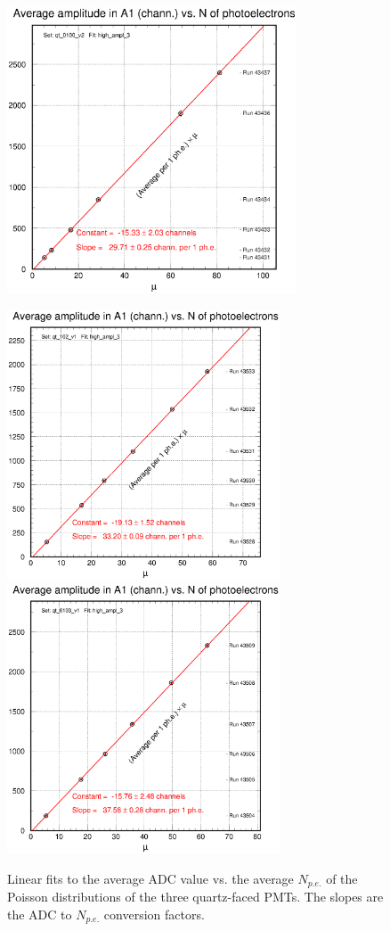 \begin{figure}
\vspace{0.5cm}
\begin{centering}
\includegraphics[height=8.5cm]{PMT-studies/qt_0100_v2_result.eps}
\end{centering}
\begin{centering}
\includegraphics[height=8.0cm]{PMT-studies/qt_0102_v1_result.eps}
\includegraphics[height=8.0cm]{PMT-studies/qt_0103_v1_result.eps}
\vspace{0.5cm}
\caption{\small{Linear fits to the average ADC value vs. the average 
$N_{p.e.}$ of the Poisson distributions of the three quartz-faced PMTs.  
The slopes are the ADC to $N_{p.e.}$ conversion factors.}}
\label{linear_quartz}
\end{centering}
\end{figure}

